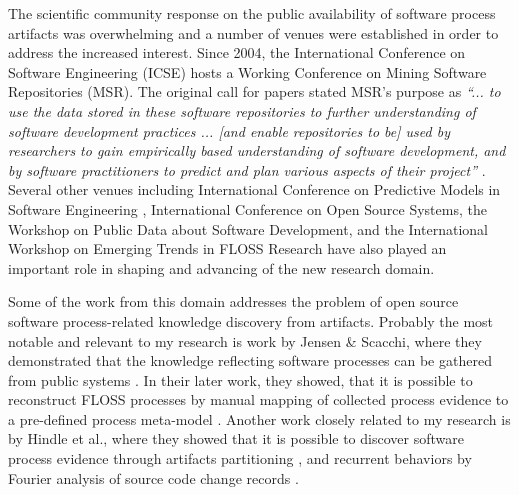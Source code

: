 The scientific community response on the public availability of software process artifacts was overwhelming 
and a number of venues were established in order to address the increased interest. 
Since 2004, the International Conference on Software Engineering (ICSE) hosts a Working Conference on 
Mining Software Repositories (MSR). The original call for papers stated MSR's purpose as 
\textit{``... to use the data stored in these software repositories to further understanding of software 
development practices ... [and enable repositories to be] used by researchers to gain empirically based 
understanding of software development, and by software practitioners to predict and plan various aspects 
of their project''} \cite{msr2004} \cite{citeulike:7853299}. 
Several other venues including  International Conference on Predictive Models in Software Engineering \cite{promise12}, 
International Conference on Open Source Systems, the Workshop on Public Data about Software Development, 
and the International Workshop on Emerging Trends in FLOSS Research have also played
an important role in shaping and advancing of the new research domain.

Some of the work from this domain addresses the problem of open source software process-related 
knowledge discovery from artifacts. 
Probably the most notable and relevant to my research is work by Jensen \& Scacchi, where they demonstrated 
that the knowledge reflecting software processes can be gathered from public systems \cite{citeulike:12550640}. 
In their later work, they showed, that it is possible to reconstruct FLOSS processes by manual mapping of 
collected process evidence to a pre-defined process meta-model \cite{citeulike:5043664} \cite{citeulike:5128808}. 
Another work closely related to my research is by Hindle et al., where they showed that it is possible to 
discover software process evidence through artifacts partitioning \cite{citeulike:10377366},
and recurrent behaviors by Fourier analysis of source code change records \cite{citeulike:10377345}.

